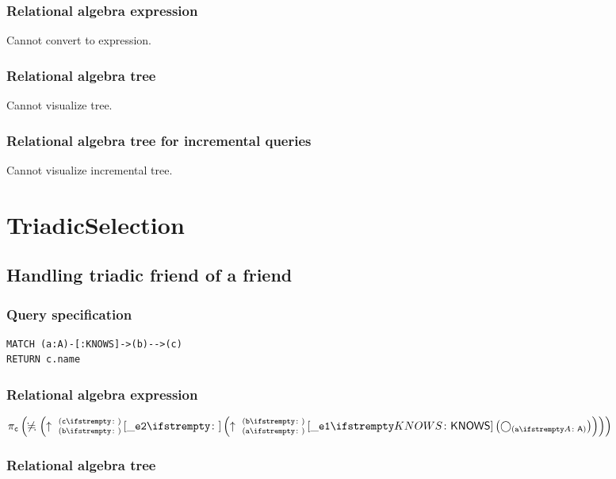 \subsubsection*{Relational algebra expression}

Cannot convert to expression.

\subsubsection*{Relational algebra tree}

Cannot visualize tree.

\subsubsection*{Relational algebra tree for incremental queries}

Cannot visualize incremental tree.

\section{TriadicSelection}

\subsection{Handling triadic friend of a friend}

\subsubsection*{Query specification}

\begin{lstlisting}
MATCH (a:A)-[:KNOWS]->(b)-->(c)
RETURN c.name
\end{lstlisting}

\subsubsection*{Relational algebra expression}

$\projection{\var{c}} \left(\alldifferent{} \left(\expandout{b}{c}{}{\_e2}{} \left(\expandout{a}{b}{}{\_e1}{KNOWS} \left(\getvertices{a}{A}\right)\right)\right)\right)$

\subsubsection*{Relational algebra tree}


